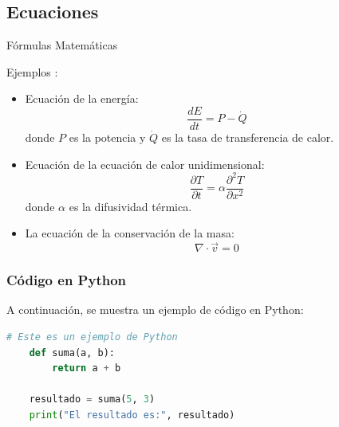 \documentclass{beamer}
\begin{document}
\subsection{Ecuaciones}
\begin{frame}{Fórmulas Matemáticas}

Ejemplos :

\begin{itemize}
    \item Ecuación de la energía: 
    \[
    \frac{dE}{dt} = P - \dot{Q}
    \]
    donde \( P \) es la potencia y \( \dot{Q} \) es la tasa de transferencia de calor.

    \item Ecuación de la ecuación de calor unidimensional:
    \[
    \frac{\partial T}{\partial t} = \alpha \frac{\partial^2 T}{\partial x^2}
    \]
    donde \( \alpha \) es la difusividad térmica.

    \item La ecuación de la conservación de la masa:
    \[
    \nabla \cdot \vec{v} = 0
    \]
\end{itemize}

\end{frame}


\begin{frame}[fragile]
\frametitle{Código en Python}
\scriptsize

A continuación, se muestra un ejemplo de código en Python:

    \begin{lstlisting}[language=Python, style=pythonstyle]
    # Este es un ejemplo de Python
    def suma(a, b):
        return a + b
    
    resultado = suma(5, 3)
    print("El resultado es:", resultado)
    \end{lstlisting}

\end{frame}
\end{document}
